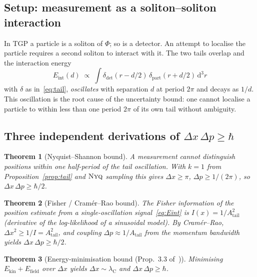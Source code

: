 \documentclass[11pt,a4paper]{article}
\renewcommand{\Phi}{\varPhi}
\newcommand{\Atail}{A_{\mathrm{tail}}}
\newcommand{\Nyquist}{\ensuremath{\textsc{Nyq}}}
\newtheorem{theorem}{Theorem}
\begin{document}
\subsection{Setup: measurement as a soliton--soliton interaction}

In TGP a particle is a soliton of $\Phi$; so is a detector. An
attempt to localise the particle requires a second soliton to
interact with it. The two tails overlap and the interaction energy
\begin{equation}\label{eq:Eint}
  E_{\mathrm{int}}(d) \;\propto\;
    \int \delta_{\mathrm{det}}(r-d/2)\,\delta_{\mathrm{part}}(r+d/2)\,\mathrm{d}^{3}r
\end{equation}
with $\delta$ as in~\eqref{eq:tail}, \emph{oscillates} with separation
$d$ at period $2\pi$ and decays as $1/d$. This oscillation is the
root cause of the uncertainty bound: one cannot localise a particle
to within less than one period $2\pi$ of its own tail without
ambiguity.

\subsection{Three independent derivations of $\Delta x\,\Delta p\geq\hbar$}

\begin{theorem}[Nyquist--Shannon bound]\label{thm:nyq}
A measurement cannot distinguish positions within one half-period of
the tail oscillation. With $k=1$ from Proposition~\ref{prop:tail}
and $\Nyquist$ sampling this gives $\Delta x\geq\pi$, $\Delta p\geq 1/(2\pi)$,
so $\Delta x\,\Delta p\geq\hbar/2$.
\end{theorem}

\begin{theorem}[Fisher / Cram\'er--Rao bound]\label{thm:cr}
The Fisher information of the position estimate from a
single-oscillation signal~\eqref{eq:Eint} is $I(x)=1/\Atail^{2}$
(derivative of the log-likelihood of a sinusoidal model).
By Cram\'er--Rao, $\Delta x^{2}\geq 1/I=\Atail^{2}$, and coupling
$\Delta p\approx 1/\Atail$ from the momentum bandwidth yields
$\Delta x\,\Delta p\geq\hbar/2$.
\end{theorem}

\begin{theorem}[Energy-minimisation bound (Prop.~3.3 of~\cite{TGP-core})]%
\label{thm:emin}
Minimising $E_{\mathrm{kin}}+E_{\mathrm{field}}$ over $\Delta x$ yields
$\Delta x\sim\lambda_{\mathrm{C}}$ and $\Delta x\,\Delta p\geq\hbar$.
\end{theorem}
\end{document}
